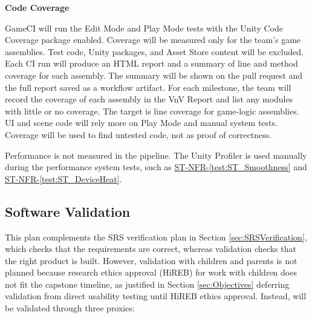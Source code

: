 \documentclass[10pt,titlepage]{article}
\newcommand{\testref}[1]{\hyperref[test:#1]{ST-NFR-\ref*{test:#1}}}
\newcommand{\constref}[1]{\hyperlink{const:#1}{\texttt{\detokenize{#1}}}}
\begin{document}
\textbf{Code Coverage}

GameCI will run the Edit Mode and Play Mode tests
with the Unity Code Coverage package enabled. Coverage will be measured only
for the team's game assemblies. Test code, Unity packages, and Asset Store
content will be excluded. Each CI run will produce an HTML report and a
summary of line and method coverage for each assembly. The summary will be
shown on the pull request and the full report saved as a workflow artifact.
For each milestone, the team will record the coverage of each assembly in the
VnV Report and list any modules with little or no coverage. The target is
\constref{COVERAGE_LINE_TARGET} line coverage for game-logic assemblies. UI and
scene code will rely more on Play Mode and manual system tests. Coverage will
be used to find untested code, not as proof of correctness.

Performance is not measured in the pipeline. The Unity Profiler is used
manually during the performance system tests, such as \testref{ST_Smoothness}
and \testref{ST_DeviceHeat}.

\subsection{Software Validation}\label{sec:SoftwareValidation}

This plan complements the SRS verification plan in Section \ref{sec:SRSVerification}, which checks that the requirements are correct, 
whereas validation checks that the right product is built. However, validation with children and parents is not 
planned because research ethics approval (HiREB) for work with children does not fit the capstone timeline, as 
justified in Section \ref{sec:Objectives} deferring validation from direct usability testing until HiREB ethics approval. 
Instead, \progname{} will be validated through three proxies:
\end{document}
